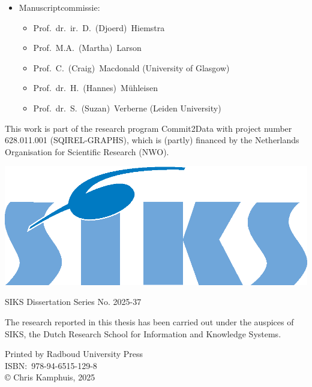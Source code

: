 \begin{itemize}
	\item[] Manuscriptcommissie:
	\begin{itemize}
		\item[] {Prof.\ dr.\ ir.\ D.\ (Djoerd)\ Hiemstra}
		\item[] {Prof.\ M.A.\ (Martha)\ Larson}
		\item[] {Prof.\ C.\ (Craig)\ Macdonald\hfill} (University of Glasgow)
		\item[] {Prof.\ dr.\ H.\ (Hannes)\ Mühleisen} 
		\item[] {Prof.\ dr.\ S.\ (Suzan)\ Verberne\hfill} (Leiden University) 
	\end{itemize}
\end{itemize}

\vfill

\noindent%
\begin{minipage}[b][][b]{0.95\textwidth} %
	{
		\setlength{\parindent}{0cm}%
		This work is part of the research program Commit2Data with project number 628.011.001 (SQIREL-GRAPHS), which is (partly) financed by the Netherlands Organisation for Scientific Research (NWO).
		
	}
	
	\vspace{0.25cm}
	
	
	{
		\includegraphics[scale=0.4]{imgs/siks.kleur.eps}
		\setlength{\parindent}{0cm}%
		
		SIKS Dissertation Series No. 2025-37
		
		\vspace{0.1cm}
		
		The research reported in this thesis has been carried out under the auspices of SIKS, the Dutch Research School for Information and Knowledge Systems.
	}
		
	\vspace{0.25cm}	
			
	{
		\setlength{\parindent}{0cm}%
		Printed by Radboud University Press\\[\baselineskip]
		ISBN:\ 978-94-6515-129-8\\[\baselineskip]
		\copyright{} Chris Kamphuis, 2025\\[\baselineskip]
	}
\end{minipage}%
